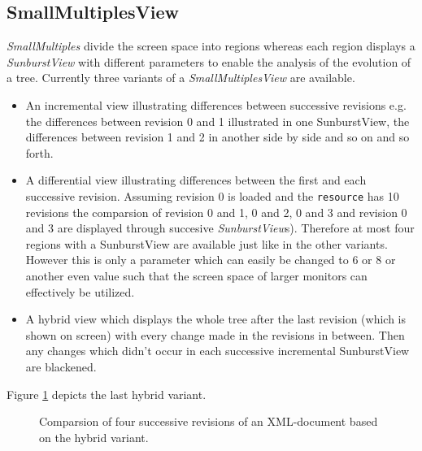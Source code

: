 \documentclass{llncs}
\begin{document}
\subsection{SmallMultiplesView}
\emph{SmallMultiples} divide the screen space into regions whereas each region displays a \emph{SunburstView} with different parameters to enable the analysis of the evolution of a tree.
Currently three variants of a \emph{SmallMultiplesView} are available. 

\begin{itemize}
\item An incremental view illustrating differences between successive revisions e.g. the differences between revision 0 and 1 illustrated in one SunburstView, the differences between revision 1 and 2 in another side by side and so on and so forth.
\item A differential view illustrating differences between the first and each successive revision. Assuming revision 0 is loaded and the \texttt{resource} has 10 revisions the comparsion of revision 0 and 1, 0 and 2, 0 and 3 and revision 0 and 3 are displayed through succesive \emph{SunburstView}s). Therefore at most four regions with a SunburstView are available just like in the other variants. However this is only a parameter which can easily be changed to 6 or 8 or another even value such that the screen space of larger monitors can effectively be utilized.
\item A hybrid view which displays the whole tree after the last revision (which is shown on screen) with every change made in the revisions in between. Then any changes which didn't occur in each successive incremental SunburstView are blackened.
\end{itemize}

Figure \ref{fig:treetank-gui-smallmultiples} depicts the last hybrid variant.

\begin{figure}[htb]
\caption{\label{fig:treetank-gui-smallmultiples} Comparsion of four successive revisions of an XML-document based on the hybrid variant.}
\end{figure}
\end{document}
